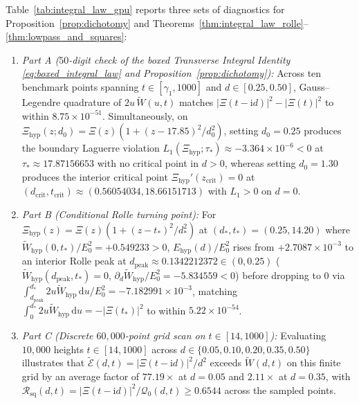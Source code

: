 \documentclass[11pt,a4paper,reqno]{amsart}
\theoremstyle{definition}
\theoremstyle{remark}
\numberwithin{equation}{section}
\newcommand{\dd}{\mathrm{d}}
\newcommand{\ii}{\mathrm{i}}
\newcommand{\Wtil}{\widetilde{W}}
\newcommand{\Etil}{\widetilde{\mathcal{E}}}
\begin{document}
Table~\ref{tab:integral_law_gpu} reports three sets of diagnostics for Proposition~\ref{prop:dichotomy} and Theorems~\ref{thm:integral_law_rolle}--\ref{thm:lowpass_and_squares}:
\begin{enumerate}
\item \emph{Part A ($50$-digit check of the boxed Transverse Integral Identity \eqref{eq:boxed_integral_law} and Proposition~\ref{prop:dichotomy}):} Across ten benchmark points spanning $t \in [\gamma_1, 1000]$ and $d \in [0.25, 0.50]$, Gauss--Legendre quadrature of $2u\,\Wtil(u,t)$ matches $|\Xi(t-\ii d)|^2 - |\Xi(t)|^2$ to within $8.75 \times 10^{-51}$. Simultaneously, on $\Xi_{\mathrm{hyp}}(z; d_0) = \Xi(z)(1 + (z-17.85)^2/d_0^2)$, setting $d_0 = 0.25$ produces the boundary Laguerre violation $L_1(\Xi_{\mathrm{hyp}}; \tau_*) \approx -3.364 \times 10^{-6} < 0$ at $\tau_* \approx 17.87156653$ with no critical point in $d > 0$, whereas setting $d_0 = 1.30$ produces the interior critical point $\Xi_{\mathrm{hyp}}'(z_{\mathrm{crit}}) = 0$ at $(d_{\mathrm{crit}}, t_{\mathrm{crit}}) \approx (0.56054034, 18.66151713)$ with $L_1 > 0$ on $d = 0$.
\item \emph{Part B (Conditional Rolle turning point):} For $\Xi_{\mathrm{hyp}}(z) = \Xi(z)(1 + (z - t_*)^2/d_*^2)$ at $(d_*, t_*) = (0.25, 14.20)$ where $\Wtil_{\mathrm{hyp}}(0,t_*)/E_0^2 = +0.549233 > 0$, $E_{\mathrm{hyp}}(d)/E_0^2$ rises from $+2.7087 \times 10^{-3}$ to an interior Rolle peak at $d_{\mathrm{peak}} \approx 0.1342212372 \in (0, 0.25)$ ($\Wtil_{\mathrm{hyp}}(d_{\mathrm{peak}}, t_*) = 0$, $\partial_d\Wtil_{\mathrm{hyp}}/E_0^2 = -5.834559 < 0$) before dropping to $0$ via $\int_{d_{\mathrm{peak}}}^{d_*} 2u\Wtil_{\mathrm{hyp}}\,\dd u / E_0^2 = -7.182991 \times 10^{-3}$, matching $\int_0^{d_*} 2u\Wtil_{\mathrm{hyp}}\,\dd u = -|\Xi(t_*)|^2$ to within $5.22 \times 10^{-54}$.
\item \emph{Part C (Discrete $60{,}000$-point grid scan on $t \in [14, 1000]$):} Evaluating $10{,}000$ heights $t \in [14, 1000]$ across $d \in \{0.05, 0.10, 0.20, 0.35, 0.50\}$ illustrates that $\Etil(d,t) = |\Xi(t-\ii d)|^2/d^2$ exceeds $\Wtil(d,t)$ on this finite grid by an average factor of $77.19\times$ at $d = 0.05$ and $2.11\times$ at $d = 0.35$, with $\mathcal{R}_{\mathrm{sq}}(d,t) = |\Xi(t-\ii d)|^2/\mathcal{Q}_0(d,t) \ge 0.6544$ across the sampled points.
\end{enumerate}
\end{document}
